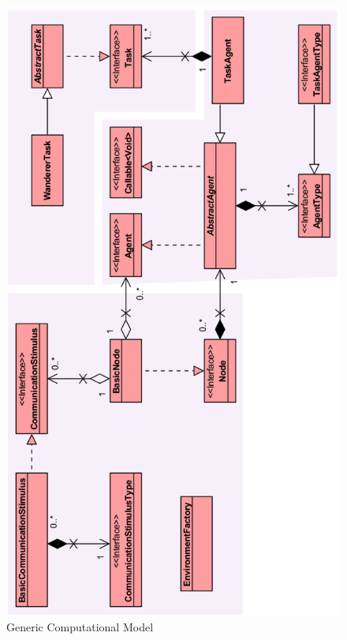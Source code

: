 \begin{figure}[H]
  \centering
  \includegraphics[width=0.7\linewidth]{gfx/uml-generic-overview.png}
  \caption{Generic Computational Model}
  \label{fig:generic-model}
\end{figure}